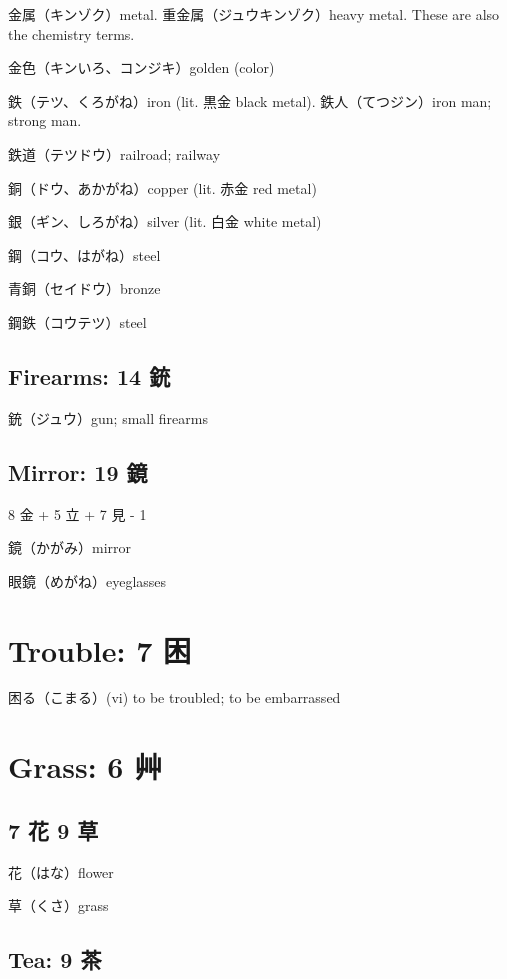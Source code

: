 金属（キンゾク）metal.
重金属（ジュウキンゾク）heavy metal.
These are also the chemistry terms.

金色（キンいろ、コンジキ）golden (color)

鉄（テツ、くろがね）iron (lit. 黒金 black metal).
鉄人（てつジン）iron man; strong man.

鉄道（テツドウ）railroad; railway

銅（ドウ、あかがね）copper (lit. 赤金 red metal)

銀（ギン、しろがね）silver (lit. 白金 white metal)

鋼（コウ、はがね）steel

青銅（セイドウ）bronze

鋼鉄（コウテツ）steel

\subsection{Firearms: 14 銃}

銃（ジュウ）gun; small firearms

\subsection{Mirror: 19 鏡}

8 金 + 5 立 + 7 見 - 1

鏡（かがみ）mirror

眼鏡（めがね）eyeglasses

\section{Trouble: 7 困}

困る（こまる）(vi) to be troubled; to be embarrassed

\section{Grass: 6 艸}

\subsection{7 花 9 草}

花（はな）flower

草（くさ）grass

\subsection{Tea: 9 茶}


